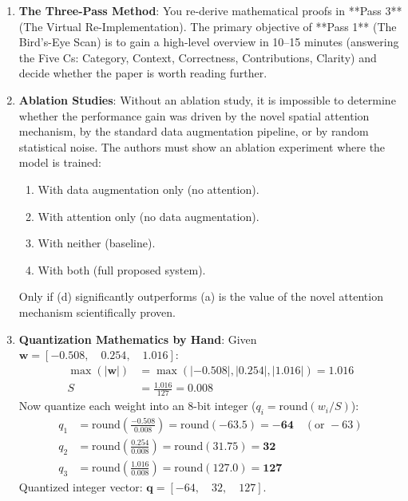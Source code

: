 \begin{enumerate}
    \item \textbf{The Three-Pass Method}:
    You re-derive mathematical proofs in **Pass 3** (The Virtual Re-Implementation). 
    The primary objective of **Pass 1** (The Bird's-Eye Scan) is to gain a high-level overview in 10--15 minutes (answering the Five Cs: Category, Context, Correctness, Contributions, Clarity) and decide whether the paper is worth reading further.

    \item \textbf{Ablation Studies}:
    Without an ablation study, it is impossible to determine whether the performance gain was driven by the novel spatial attention mechanism, by the standard data augmentation pipeline, or by random statistical noise. 
    The authors must show an ablation experiment where the model is trained:
    \begin{enumerate}[label=(\alph*)]
        \item With data augmentation only (no attention).
        \item With attention only (no data augmentation).
        \item With neither (baseline).
        \item With both (full proposed system).
    \end{enumerate}
    Only if (d) significantly outperforms (a) is the value of the novel attention mechanism scientifically proven.

    \item \textbf{Quantization Mathematics by Hand}:
    Given $\mathbf{w} = [-0.508, \quad 0.254, \quad 1.016]$:
    \begin{align*}
    \max(|\mathbf{w}|) &= \max(|-0.508|, |0.254|, |1.016|) = 1.016 \\
    S &= \frac{1.016}{127} = \mathbf{0.008}
    \end{align*}
    Now quantize each weight into an 8-bit integer ($q_i = \text{round}(w_i / S)$):
    \begin{align*}
    q_1 &= \text{round}\left(\frac{-0.508}{0.008}\right) = \text{round}(-63.5) = \mathbf{-64} \quad (\text{or } -63) \\
    q_2 &= \text{round}\left(\frac{0.254}{0.008}\right) = \text{round}(31.75) = \mathbf{32} \\
    q_3 &= \text{round}\left(\frac{1.016}{0.008}\right) = \text{round}(127.0) = \mathbf{127}
    \end{align*}
    Quantized integer vector: $\mathbf{q} = [-64, \quad 32, \quad 127]$.


\end{enumerate}
